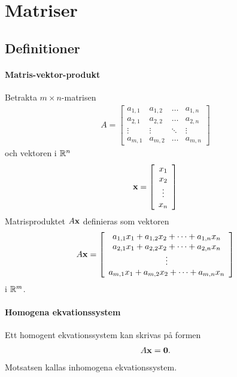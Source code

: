 \section{Matriser}

\subsection{Definitioner}

\paragraph{Matris-vektor-produkt}
Betrakta $m\times n$-matrisen
\begin{align*}
	A =
	\left[\begin{array}{cccc}
    	a_{1,1} & a_{1,2} & \dots  & a_{1,n} \\
    	a_{2,1} & a_{2,2} & \dots  & a_{2,n} \\
    	\vdots  & \vdots  & \ddots & \vdots  \\
	    a_{m,1} & a_{m,2} & \dots  & a_{m,n}
	\end{array}\right]
\end{align*}
och vektoren i $\mathbb{R}^n$
\begin{align*}
	\vectorbold{x} =
	\left[\begin{array}{c}
    	x_1    \\
    	x_2    \\
    	\vdots \\
	    x_n
	\end{array}\right]
\end{align*}
Matrisproduktet $A\vectorbold{x}$ definieras som vektoren
\begin{align*}
	A\vectorbold{x} =
	\left[\begin{array}{c}
    	a_{1,1}x_1 + a_{1,2}x_2 + \dots + a_{1,n}x_n \\
    	a_{2,1}x_1 + a_{2,2}x_2 + \dots + a_{2,n}x_n \\
    	\vdots                                       \\
	    a_{m,1}x_1 + a_{m,2}x_2 + \dots + a_{m,n}x_n
	\end{array}\right]
\end{align*}
i $\mathbb{R}^m$.

\paragraph{Homogena ekvationssystem}
Ett homogent ekvationssystem kan skrivas på formen
\begin{align*}
	A\vect{x} = \vect{0}.
\end{align*}
Motsatsen kallas inhomogena ekvationssystem.

